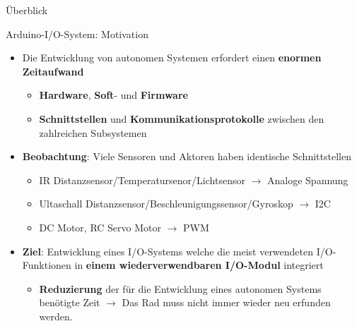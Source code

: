\documentclass{beamer}
\begin{document}
\begin{frame}{\"Uberblick}
	
\end{frame}
\begin{frame}{Arduino-I/O-System: Motivation}
	\begin{itemize}
		\item Die Entwicklung von autonomen Systemen erfordert einen \textbf{enormen Zeitaufwand}
		\begin{itemize}
			\item \textbf{Hardware}, \textbf{Soft}- und \textbf{Firmware}
			\item \textbf{Schnittstellen} und \textbf{Kommunikationsprotokolle} zwischen den zahlreichen Subsystemen
		\end{itemize}
	\end{itemize}
	\begin{itemize}
		\item \textbf{Beobachtung}: Viele Sensoren und Aktoren haben identische Schnittstellen
		\begin{itemize}
			\item IR Distanzsensor/Temperatursenor/Lichtsensor  $\rightarrow$ Analoge Spannung
			\item Ultaschall Distanzsensor/Beschleunigungssensor/Gyroskop $\rightarrow$ I2C
			\item DC Motor, RC Servo Motor $\rightarrow$ PWM
		\end{itemize}
	\end{itemize}
	\begin{itemize}
		\item \textbf{Ziel}: Entwicklung eines I/O-Systems welche die meist verwendeten I/O-Funktionen in \textbf{einem wiederverwendbaren I/O-Modul} integriert
		\begin{itemize}
			\item \textbf{Reduzierung} der f\"ur die Entwicklung eines autonomen Systems ben\"otigte Zeit $\rightarrow$ Das Rad muss nicht immer wieder neu erfunden werden.
		\end{itemize}
	\end{itemize}
\end{frame}
\end{document}
